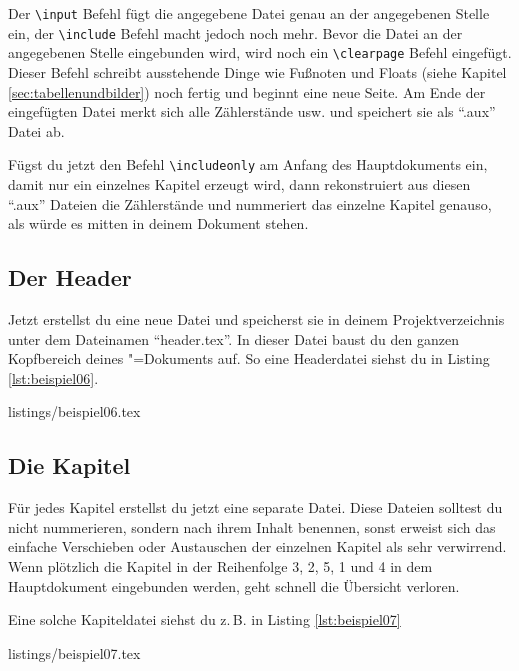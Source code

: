 Der \texttt{\textbackslash input} Befehl fügt die angegebene Datei genau an der angegebenen Stelle ein, der \texttt{\textbackslash include} Befehl macht jedoch noch mehr. Bevor die Datei an der angegebenen Stelle eingebunden wird, wird noch ein \texttt{\textbackslash clearpage} Befehl eingefügt. Dieser Befehl schreibt ausstehende Dinge wie Fußnoten und Floats (siehe Kapitel \ref{sec:tabellenundbilder}) noch fertig und beginnt eine neue Seite. Am Ende der eingefügten Datei merkt sich \DMLLaTeX{} alle Zählerstände usw. und speichert sie als \enquote{.aux} Datei ab.

Fügst du jetzt den Befehl \texttt{\textbackslash includeonly} am Anfang des Hauptdokuments ein, damit nur ein einzelnes Kapitel erzeugt wird, dann rekonstruiert \DMLLaTeX{} aus diesen \enquote{.aux} Dateien die Zählerstände und nummeriert das einzelne Kapitel genauso, als würde es mitten in deinem Dokument stehen.

\subsection{Der Header}

Jetzt erstellst du eine neue Datei und speicherst sie in deinem Projektverzeichnis unter dem Dateinamen \enquote{header.tex}. In dieser Datei baust du den ganzen Kopfbereich deines \DMLLaTeX"=Dokuments auf. So eine Headerdatei siehst du in Listing \ref{lst:beispiel06}.

%
	{listings/beispiel06.tex}

\subsection{Die Kapitel}

Für jedes Kapitel erstellst du jetzt eine separate Datei. Diese Dateien solltest du nicht nummerieren, sondern nach ihrem Inhalt benennen, sonst erweist sich das einfache Verschieben oder Austauschen der einzelnen Kapitel als sehr verwirrend. Wenn plötzlich die Kapitel in der Reihenfolge 3, 2, 5, 1 und 4 in dem Hauptdokument eingebunden werden, geht schnell die Übersicht verloren.

Eine solche Kapiteldatei siehst du z.\,B. in Listing \ref{lst:beispiel07}

%
	{listings/beispiel07.tex}

